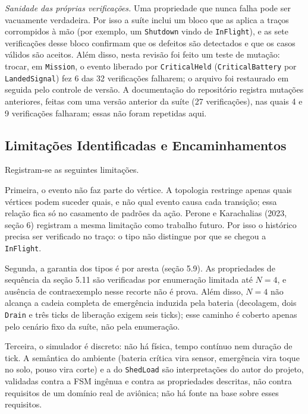 \documentclass[12pt,a4paper]{article}
\begin{document}
\textit{Sanidade das próprias verificações.} Uma propriedade que nunca falha pode ser vacuamente verdadeira. Por isso a suíte inclui um bloco que as aplica a traços corrompidos à mão (por exemplo, um \texttt{Shutdown} vindo de \texttt{InFlight}), e as sete verificações desse bloco confirmam que os defeitos são detectados e que os casos válidos são aceitos. Além disso, nesta revisão foi feito um teste de mutação: trocar, em \texttt{Mission}, o evento liberado por \texttt{CriticalHeld} (\texttt{CriticalBattery} por \texttt{LandedSignal}) fez 6 das 32 verificações falharem; o arquivo foi restaurado em seguida pelo controle de versão. A documentação do repositório registra mutações anteriores, feitas com uma versão anterior da suíte (27 verificações), nas quais 4 e 9 verificações falharam; essas não foram repetidas aqui.

\subsection{Limitações Identificadas e Encaminhamentos}

Registram-se as seguintes limitações.

Primeira, o evento não faz parte do vértice. A topologia restringe apenas quais vértices podem suceder quais, e não qual evento causa cada transição; essa relação fica só no casamento de padrões da ação. Perone e Karachalias (2023, seção 6) registram a mesma limitação como trabalho futuro. Por isso o histórico precisa ser verificado no traço: o tipo não distingue por que se chegou a \texttt{InFlight}.

Segunda, a garantia dos tipos é por aresta (seção 5.9). As propriedades de sequência da seção 5.11 são verificadas por enumeração limitada até $N = 4$, e ausência de contraexemplo nesse recorte não é prova. Além disso, $N = 4$ não alcança a cadeia completa de emergência induzida pela bateria (decolagem, dois \texttt{Drain} e três ticks de liberação exigem seis ticks); esse caminho é coberto apenas pelo cenário fixo da suíte, não pela enumeração.

Terceira, o simulador é discreto: não há física, tempo contínuo nem duração de tick. A semântica do ambiente (bateria crítica vira sensor, emergência vira toque no solo, pouso vira corte) e a do \texttt{ShedLoad} são interpretações do autor do projeto, validadas contra a FSM ingênua e contra as propriedades descritas, não contra requisitos de um domínio real de aviônica; não há fonte na base sobre esses requisitos.
\end{document}
